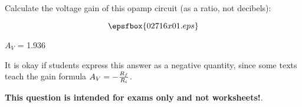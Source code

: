 

Calculate the voltage gain of this opamp circuit (as a ratio, not decibels):

$$\epsfbox{02716x01.eps}$$







$A_V$ = 1.936

\vskip 10pt

It is okay if students express this answer as a negative quantity, since some texts teach the gain formula $A_V = -{R_f \over R_i}$.







{\bf This question is intended for exams only and not worksheets!}.




